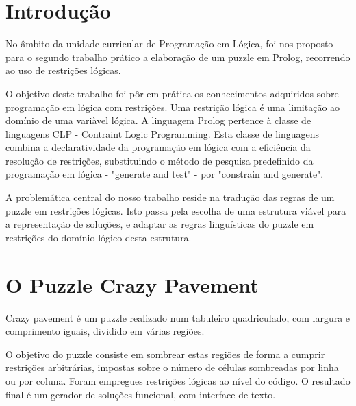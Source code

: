 \documentclass[a4paper]{article}
\begin{document}

\newpage

\tableofcontents



\newpage

\section{Introdução}
No âmbito da unidade curricular de Programação em Lógica, foi-nos proposto para o segundo trabalho prático a elaboração de um puzzle em Prolog, recorrendo ao uso de restrições lógicas.

O objetivo deste trabalho foi pôr em prática os conhecimentos adquiridos sobre programação em lógica com restrições. Uma restrição lógica é uma limitação ao domínio de uma variàvel lógica. A linguagem Prolog pertence à classe de linguagens CLP - Contraint Logic Programming. Esta classe de linguagens combina a declaratividade da programação em lógica com a eficiência da resolução de restrições, substituindo o método de pesquisa predefinido da programação em lógica - "generate and test" - por "constrain and generate".

A problemática central do nosso trabalho reside na tradução das regras de um puzzle em restrições lógicas. Isto passa pela escolha de uma estrutura viável para a representação de soluções, e adaptar as regras linguísticas do puzzle em restrições do domínio lógico desta estrutura.

\section{O Puzzle Crazy Pavement}
Crazy pavement é um puzzle realizado num tabuleiro quadriculado, com largura e comprimento iguais, dividido em várias regiões.

O objetivo do puzzle consiste em sombrear estas regiões de forma a cumprir restrições arbitrárias, impostas sobre o número de células sombreadas por linha ou por coluna. 
Foram empregues restrições lógicas ao nível do código. O resultado final é um gerador de soluções funcional, com interface de texto.
\end{document}

